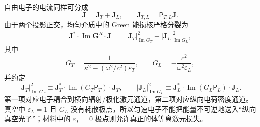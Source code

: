 自由电子的电流同样可分成
\[
\mathbf J=\mathbf J_T+\mathbf J_L,
\qquad
\mathbf J_{T,L}=\mathsf P_{T,L}\mathbf J.
\]
由于两个投影正交，均匀介质中的 Green 能损核严格分裂为
\begin{equation}
\boxed{
\begin{aligned}
\mathbf J^*\!\cdot\operatorname{Im}\mathbf G^R\!\cdot\mathbf J
={}&|\mathbf J_T|_{\operatorname{Im}G_T}^2
+|\mathbf J_L|_{\operatorname{Im}G_L}^2,
\end{aligned}}
\label{eq:electron_loss_LT_split}
\end{equation}
其中
\[
G_T=\frac1{\kappa^2-(\omega^2/c^2)\varepsilon_T},
\qquad
G_L=-\frac{c^2}{\omega^2\varepsilon_L},
\]
并约定
\[
|\mathbf J_T|_{\operatorname{Im}G_T}^2
\equiv
\mathbf J_T^*\!\cdot\operatorname{Im}(G_T\mathsf P_T)\cdot\mathbf J_T,
\qquad
|\mathbf J_L|_{\operatorname{Im}G_L}^2
\equiv
\mathbf J_L^*\!\cdot\operatorname{Im}(G_L\mathsf P_L)\cdot\mathbf J_L.
\]
第一项对应电子耦合到横向辐射/极化激元通道，第二项对应纵向电荷密度通道。真空中 $\varepsilon_L=1$ 且 $G_L$ 没有耗散极点，所以匀速电子不能把能量不可逆地送入“纵向真空光子”；材料中的 $\varepsilon_L=0$ 极点则允许真正的体等离激元损失。

